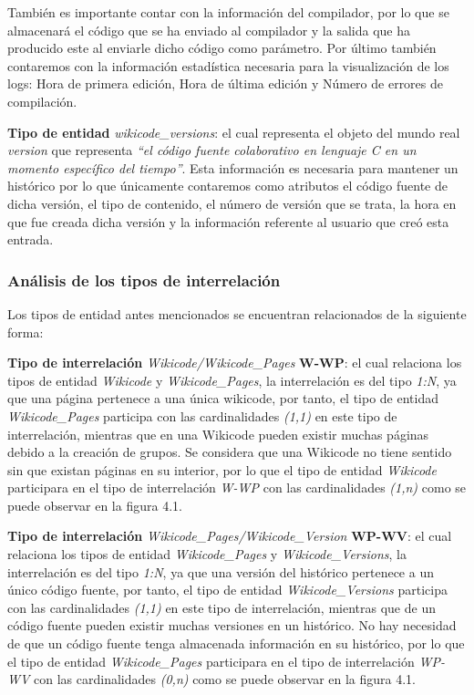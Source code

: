 \begin{description}
	También es importante contar con la información del compilador, por lo que se almacenará el código que se ha enviado al compilador y la salida que ha producido este al enviarle dicho código como parámetro. Por último también contaremos con la información estadística necesaria para la visualización de los logs: Hora de primera edición, Hora de última edición y Número de errores de compilación.
	
	\item{\textbf{Tipo de entidad}} \emph{wikicode\_versions}: el cual representa el objeto del mundo real \emph{version} que representa \emph{``el código fuente colaborativo en lenguaje C en un momento específico del tiempo''}. Esta información es necesaria para mantener un histórico por lo que únicamente contaremos como atributos el código fuente de dicha versión, el tipo de contenido, el número de versión que se trata, la hora en que fue creada dicha versión y la información referente al usuario que creó esta entrada.
\end{description}

\subsubsection{Análisis de los tipos de interrelación}

Los tipos de entidad antes mencionados se encuentran relacionados de la siguiente forma:

\begin{description}
	\item{\textbf{Tipo de interrelación}} \emph{Wikicode/Wikicode\_Pages} \textbf{W-WP}: el cual relaciona los tipos de entidad \emph{Wikicode} y \emph{Wikicode\_Pages}, la interrelación es del tipo \emph{1:N}, ya que una página pertenece a una única wikicode, por tanto, el tipo de entidad \emph{Wikicode\_Pages} participa con las cardinalidades \emph{(1,1)} en este tipo de interrelación, mientras que en una Wikicode pueden existir muchas páginas debido a la creación de grupos. Se considera que una Wikicode no tiene sentido sin que existan páginas en su interior, por lo que el tipo de entidad \emph{Wikicode} participara en el tipo de interrelación \emph{W-WP} con las cardinalidades \emph{(1,n)} como se puede observar en la figura 4.1.
	
	\item{\textbf{Tipo de interrelación}} \emph{Wikicode\_Pages/Wikicode\_Version} \textbf{WP-WV}: el cual relaciona los tipos de entidad \emph{Wikicode\_Pages} y \emph{Wikicode\_Versions}, la interrelación es del tipo \emph{1:N}, ya que una versión del histórico pertenece a un único código fuente, por tanto, el tipo de entidad \emph{Wikicode\_Versions} participa con las cardinalidades \emph{(1,1)} en este tipo de interrelación, mientras que de un código fuente pueden existir muchas versiones en un histórico. No hay necesidad de que un código fuente tenga almacenada información en su histórico, por lo que el tipo de entidad \emph{Wikicode\_Pages} participara en el tipo de interrelación \emph{WP-WV} con las cardinalidades \emph{(0,n)} como se puede observar en la figura 4.1.
\end{description}

